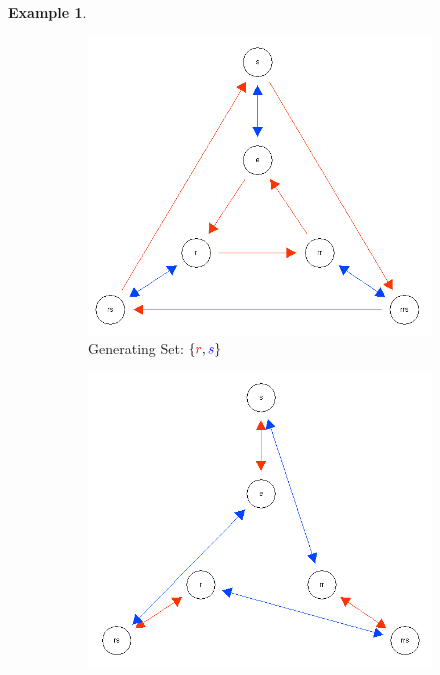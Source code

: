 \documentclass[10pt]{article}
\theoremstyle{plain}
\theoremstyle{definition}
\newtheorem{example}[theorem]{Example}
\theoremstyle{definition}
\theoremstyle{definition}
\begin{document}
\begin{multicols}{2}
\begin{example}
	\begin{figure}[t]
		\centering
		\begin{subfigure}{.3\textwidth}
			\includegraphics[scale = 0.3]{D6_gen1}
			\caption{Generating Set: $\{ \textcolor{red}{r}, \textcolor{blue}{s} \}$}
			\label{fig2:sub1}
		\end{subfigure}%
		\begin{subfigure}{.3\textwidth}
			\includegraphics[scale = 0.3]{D6_gen2}

\end{subfigure}
\end{figure}
\end{example}
\end{multicols}
\end{document}
